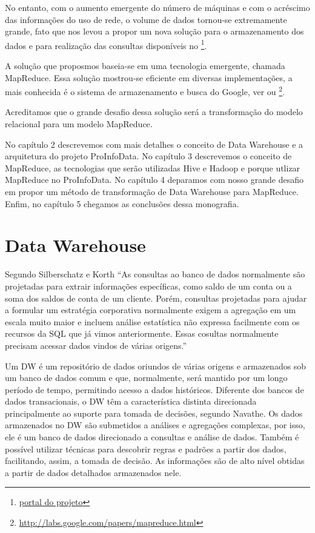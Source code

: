 \documentclass[a4paper,12pt]{article}
\begin{document}
No entanto, com o aumento emergente do número de máquinas e com o acréscimo das
informações do uso de rede, o volume de dados tornou-se extremamente grande, fato que 
nos levou a propor um nova solução para o armazenamento dos dados e para realização
das consultas disponíveis no \footnote {\href {http://seed.c3sl.ufpr.br/seed/attendance/index.html}
{portal do projeto}}.

A solução que proposmos baseia-se em uma tecnologia emergente, chamada MapReduce.
Essa solução mostrou-se eficiente em diversas implementações, a mais conhecida é
o sistema de armazenamento e busca do Google, ver \cite{MapReduceGoogle} ou
\footnote{\href {http://labs.google.com/papers/mapreduce.html} {http://labs.google.com/papers/mapreduce.html}}.

Acreditamos que o grande desafio dessa solução será a transformação do modelo
relacional para um modelo MapReduce.

No capítulo 2 descrevemos com mais detalhes o conceito de Data Warehouse e a arquitetura
do projeto ProInfoData. No capítulo 3 descrevemos o conceito de MapReduce, as 
tecnologias que serão utilizadas Hive e Hadoop e porque utlizar MapReduce no 
ProInfoData. No capítulo 4 deparamos com nosso grande desafio em propor um método de 
transformação de Data Warehouse para MapReduce. Enfim, no capítulo 5 chegamos as
conclusões dessa monografia.

\section{\textbf{Data Warehouse}}

Segundo Silberschatz e Korth \cite{Silber}“As consultas ao banco de dados normalmente 
são projetadas para extrair informações específicas, como saldo de um conta ou a soma
dos saldos de conta de um cliente. Porém, consultas projetadas para ajudar a 
formular um estratégia corporativa normalmente exigem a agregação em um escala
muito maior e incluem análise estatística não expressa facilmente com os 
recursos da SQL que já vimos anteriormente. Essas cosultas normalmente precisam 
acessar dados vindos de várias origens.”

Um DW é um repositório de dados oriundos de várias origens e armazenados sob um
banco de dados comum e que, normalmente, será mantido por um longo período de
tempo, permitindo acesso a dados históricos. Diferente dos bancos de dados
transacionais, o DW têm a característica distinta direcionada principalmente ao
suporte para tomada de decisões, segundo Navathe\cite{Navathe}. Os dados armazenados no
DW são submetidos a análises e agregações complexas, por isso, ele é um banco de
dados direcionado a consultas e análise de dados. Também é possível utilizar
técnicas para descobrir regras e padrões a partir dos dados, facilitando, assim,
a tomada de decisão. As informações são de alto nível obtidas a partir de dados
detalhados armazenados nele.
\end{document}
